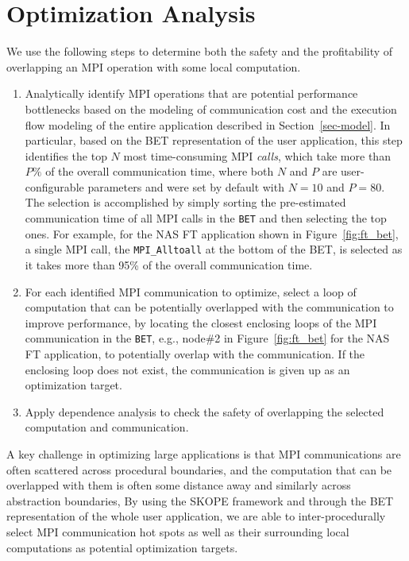 \section{Optimization Analysis}
\label {sec-analysis}

We use the following steps to
determine both the safety and the profitability of overlapping an MPI operation with some local computation.

\begin{enumerate}
\item Analytically identify MPI operations that are potential performance bottlenecks based on the modeling of communication cost
    and the execution flow modeling of the entire application described in Section~\ref{sec-model}.
    In particular, based on the BET representation of the user application, this step identifies the top $N$ most time-consuming MPI \emph{calls}, which take more than $P\%$ of the overall communication time, where both $N$ and $P$ are user-configurable parameters and were set by default with $N=10$ and $P=80$.
The selection is accomplished by simply sorting the pre-estimated communication time of all MPI  calls in the \texttt{BET} and then selecting the top ones.
For example, for the NAS FT application shown in Figure~\ref{fig:ft_bet},
a single MPI call, the \texttt{MPI\_Alltoall} at the bottom of the BET, is selected as
 it takes more than 95\% of the overall communication time.
\item
  For each identified MPI communication to optimize, select a loop of computation that can be potentially overlapped with the communication to improve performance, by  locating the closest enclosing loops of the MPI communication in the \texttt{BET},
e.g., node\#2 in Figure~\ref{fig:ft_bet} for the NAS FT application, to potentially overlap with the communication.  If the enclosing loop does not exist, the communication is given up as an optimization target.
\item
Apply dependence analysis to check the safety of overlapping the selected computation and communication.
\end{enumerate}

A key challenge in optimizing large applications is that MPI communications are often scattered across procedural boundaries,
and the computation that can be overlapped with them is often some distance away and similarly across abstraction boundaries,
By using the SKOPE framework and through the BET representation of the whole user application, we are able to inter-procedurally select MPI communication hot spots as well as their surrounding local computations as potential optimization targets.

